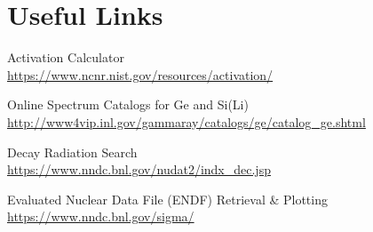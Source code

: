 \documentclass[a4paper, 11pt]{article}
\begin{document}
\newpage








\newpage

\section*{Useful Links}

Activation Calculator \\
\href{https://www.ncnr.nist.gov/resources/activation/}{https://www.ncnr.nist.gov/resources/activation/}

\vspace{0.05\textheight}
\noindent
Online Spectrum Catalogs for Ge and Si(Li) \\
\href{http://www4vip.inl.gov/gammaray/catalogs/ge/catalog\_ge.shtml}{http://www4vip.inl.gov/gammaray/catalogs/ge/catalog\_ge.shtml}

\vspace{0.05\textheight}
\noindent
Decay Radiation Search \\
\href{https://www.nndc.bnl.gov/nudat2/indx\_dec.jsp}{https://www.nndc.bnl.gov/nudat2/indx\_dec.jsp}

\vspace{0.05\textheight}
\noindent
Evaluated Nuclear Data File (ENDF) Retrieval \& Plotting \\
\href{https://www.nndc.bnl.gov/sigma/}{https://www.nndc.bnl.gov/sigma/}


\end{document}
